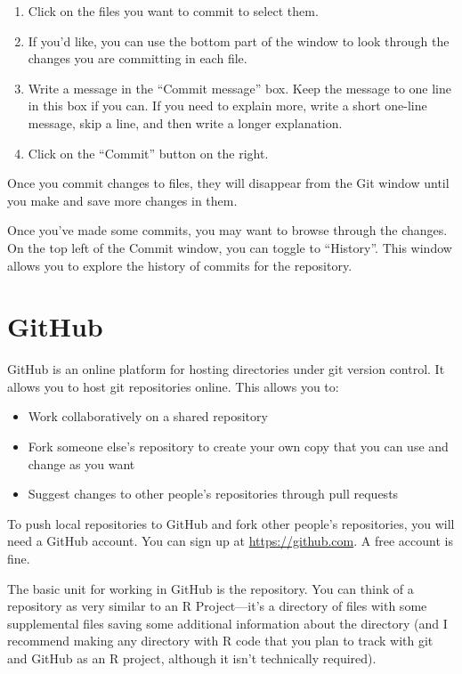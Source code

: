 \documentclass[]{tufte-book}
\providecommand{\tightlist}{%
  \setlength{\itemsep}{0pt}\setlength{\parskip}{0pt}}
\begin{document}
\begin{enumerate}
\def\labelenumi{\arabic{enumi}.}
\tightlist
\item
  Click on the files you want to commit to select them.
\item
  If you'd like, you can use the bottom part of the window to look through the
  changes you are committing in each file.
\item
  Write a message in the ``Commit message'' box. Keep the message to one line in
  this box if you can. If you need to explain more, write a short one-line
  message, skip a line, and then write a longer explanation.
\item
  Click on the ``Commit'' button on the right.
\end{enumerate}

Once you commit changes to files, they will disappear from the Git window until
you make and save more changes in them.

Once you've made some commits, you may want to browse through the changes. On
the top left of the Commit window, you can toggle to ``History''. This window
allows you to explore the history of commits for the repository.

\hypertarget{github}{%
\section{GitHub}\label{github}}

GitHub is an online platform for hosting directories under git version control.
It allows you to host git repositories online. This allows you to:

\begin{itemize}
\tightlist
\item
  Work collaboratively on a shared repository
\item
  Fork someone else's repository to create your own copy that you can use and change as you want
\item
  Suggest changes to other people's repositories through pull requests
\end{itemize}

To push local repositories to GitHub and fork other people's repositories, you
will need a GitHub account. You can sign up at \url{https://github.com}. A free
account is fine.

The basic unit for working in GitHub is the repository. You can think of a
repository as very similar to an R Project---it's a directory of files with
some supplemental files saving some additional information about the directory
(and I recommend making any directory with R code that you plan to track with
git and GitHub as an R project, although it isn't technically required).
\end{document}
